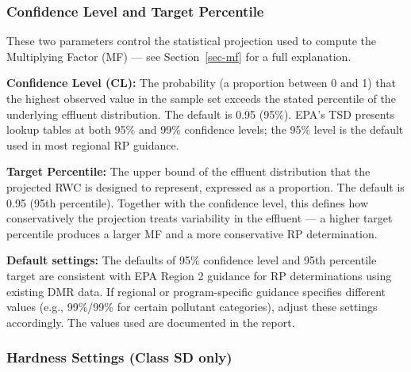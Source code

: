 \documentclass[
  11pt,
  letterpaper,
  DIV=11,
  numbers=noendperiod]{scrartcl}
\begin{document}
\subsubsection{Confidence Level and Target
Percentile}\label{sec-cl-percentile}

These two parameters control the statistical projection used to compute
the Multiplying Factor (MF) --- see Section~\ref{sec-mf} for a full
explanation.

\textbf{Confidence Level (CL):} The probability (a proportion between 0
and 1) that the highest observed value in the sample set exceeds the
stated percentile of the underlying effluent distribution. The default
is 0.95 (95\%). EPA's TSD presents lookup tables at both 95\% and 99\%
confidence levels; the 95\% level is the default used in most regional
RP guidance.

\textbf{Target Percentile:} The upper bound of the effluent distribution
that the projected RWC is designed to represent, expressed as a
proportion. The default is 0.95 (95th percentile). Together with the
confidence level, this defines how conservatively the projection treats
variability in the effluent --- a higher target percentile produces a
larger MF and a more conservative RP determination.

\begin{tcolorbox}[enhanced jigsaw, arc=.35mm, bottomrule=.15mm, bottomtitle=1mm, breakable, colback=white, colbacktitle=quarto-callout-note-color!10!white, colframe=quarto-callout-note-color-frame, coltitle=black, left=2mm, leftrule=.75mm, opacityback=0, opacitybacktitle=0.6, rightrule=.15mm, title=\textcolor{quarto-callout-note-color}{\faInfo}\hspace{0.5em}{Note}, titlerule=0mm, toprule=.15mm, toptitle=1mm]

\textbf{Default settings:} The defaults of 95\% confidence level and
95th percentile target are consistent with EPA Region 2 guidance for RP
determinations using existing DMR data. If regional or program-specific
guidance specifies different values (e.g., 99\%/99\% for certain
pollutant categories), adjust these settings accordingly. The values
used are documented in the report.

\end{tcolorbox}

\subsubsection{Hardness Settings (Class SD
only)}\label{sec-hardness-settings}
\end{document}

